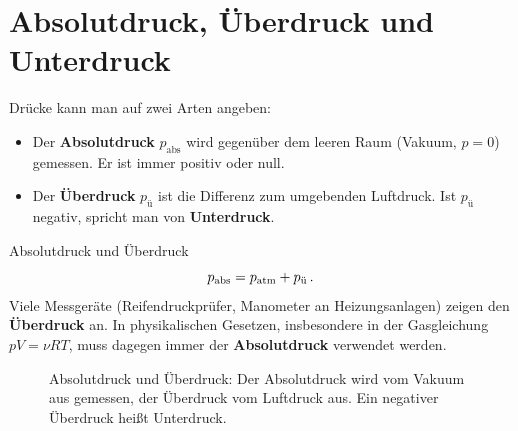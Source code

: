 \section{Absolutdruck, Überdruck und Unterdruck}\label{sec: absolut_ueberdruck}
Drücke kann man auf zwei Arten angeben:
\begin{itemize}[itemsep=1.5pt]
    \item Der \textbf{Absolutdruck} $p_\text{abs}$ wird gegenüber dem leeren Raum (Vakuum, $p = 0$) gemessen. Er ist immer positiv oder null.
    \item Der \textbf{Überdruck} $p_\text{ü}$ ist die Differenz zum umgebenden Luftdruck. Ist $p_\text{ü}$ negativ, spricht man von \textbf{Unterdruck}.
\end{itemize}
\begin{rememberbox}{Absolutdruck und Überdruck}
    \begin{equation}\label{eq: absolutdruck_ueberdruck}
        p_\text{abs} = p_{\mathrm{atm}} + p_\text{ü} \,.
    \end{equation}
    Viele Messgeräte (Reifendruckprüfer, Manometer an Heizungsanlagen) zeigen den \textbf{Überdruck} an. In physikalischen Gesetzen, insbesondere in der Gasgleichung $p V = \nu R T$, muss dagegen immer der \textbf{Absolutdruck} verwendet werden.
\end{rememberbox}

\begin{figure}[htb]
    \centering
    \caption{Absolutdruck und Überdruck: Der Absolutdruck wird vom Vakuum aus gemessen, der Überdruck vom Luftdruck aus. Ein negativer Überdruck heißt Unterdruck.}\label{fig: absolut_ueberdruck}
\end{figure}

